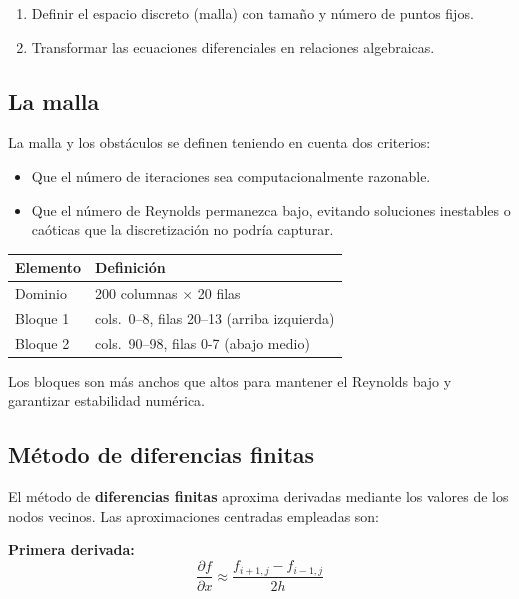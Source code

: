 \documentclass[12pt, a4paper]{article}
\begin{document}
\begin{enumerate}
  \item Definir el espacio discreto (malla) con tamaño y número de puntos fijos.
  \item Transformar las ecuaciones diferenciales en relaciones algebraicas.
\end{enumerate}

\subsection{La malla}

La malla y los obstáculos se definen teniendo en cuenta dos criterios:
\begin{itemize}
  \item Que el número de iteraciones sea computacionalmente razonable.
  \item Que el número de Reynolds permanezca bajo, evitando soluciones
        inestables o caóticas que la discretización no podría capturar.
\end{itemize}

\begin{center}
\begin{tabular}{ll}
  \toprule
  \textbf{Elemento} & \textbf{Definición} \\
  \midrule
  Dominio   & 200 columnas $\times$ 20 filas \\
  Bloque 1  & cols.\ 0–8, filas 20–13 (arriba izquierda) \\
  Bloque 2  & cols.\ 90–98, filas 0-7 (abajo medio) \\
  \bottomrule
\end{tabular}
\end{center}

Los bloques son más anchos que altos para mantener el Reynolds bajo y garantizar
estabilidad numérica.

\subsection{Método de diferencias finitas}

El método de \textbf{diferencias finitas} aproxima derivadas mediante los valores
de los nodos vecinos. Las aproximaciones centradas empleadas son:

\textbf{Primera derivada:}
\begin{equation}
  \frac{\partial f}{\partial x}
  \approx \frac{f_{i+1,j} - f_{i-1,j}}{2h}
\end{equation}
\end{document}
